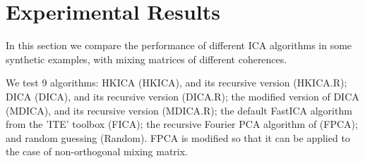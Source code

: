 \documentclass[twoside,11pt]{article}
\begin{document}
\section{Experimental Results}
\label{sec:ExpRes}
In this section we compare the performance of different ICA algorithms
in some synthetic examples, with mixing matrices of different coherences.



We test 9 algorithms: 
HKICA (HKICA), and its recursive version (HKICA.R); 
DICA  (DICA), and its recursive version (DICA.R);  
the modified version of  DICA  (MDICA), and its recursive version (MDICA.R);
the default FastICA algorithm from the 'ITE' toolbox \citep{szabo12separation} (FICA);
the recursive Fourier PCA algorithm of \citet{xiao2014FPCAPackage} (FPCA);
and random guessing (Random).
FPCA is modified so that it can be applied to the case of non-orthogonal mixing matrix.
\end{document}

